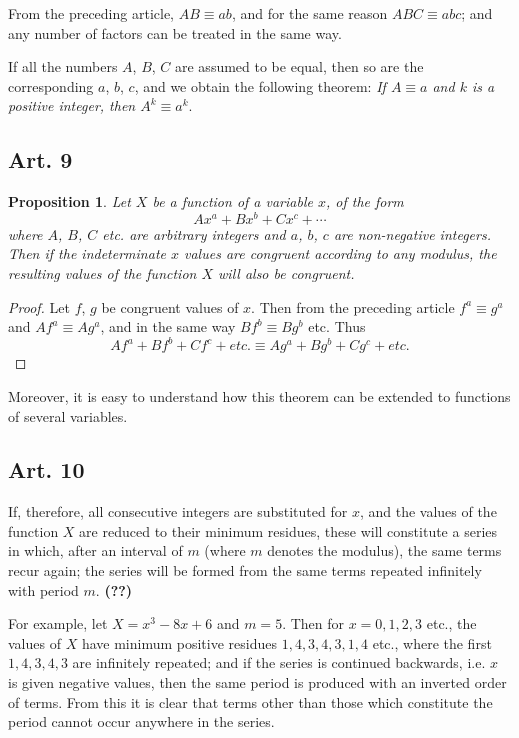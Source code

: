 \documentclass{book}
\theoremstyle{plain}
\newtheorem{proposition}{Proposition}
\begin{document}
From the preceding article, $AB \equiv ab$, and for the same reason $ABC \equiv abc$; and any number of factors can be treated in the same way.

If all the numbers $A$, $B$, $C$ are assumed to be equal, then so are the corresponding $a$, $b$, $c$, and we obtain the following theorem: \textit{If $A \equiv a$ and $k$ is a positive integer, then $A^k \equiv a^k$}.

\subsection*{Art. 9} 
\begin{proposition} Let $X$ be a function of a variable $x$, of the form
\[ A x^a + B x^b + C x^c + \cdots \]
where $A$, $B$, $C$ etc. are arbitrary integers and $a$, $b$, $c$ are non-negative integers.  Then if the indeterminate $x$ values are congruent according to any modulus, the resulting values of the function $X$ will also be congruent. \end{proposition}
\begin{proof} Let $f$, $g$ be congruent values of $x$.  Then from the preceding article $f^a \equiv g^a$ and $Af^a \equiv Ag^a$, and in the same way $Bf^b \equiv Bg^b$ etc.  Thus 
\[ Af^a + Bf^b + Cf^c + \textit{etc}. \equiv Ag^a + Bg^b + Cg^c + \textit{etc}. \]
\end{proof}
Moreover, it is easy to understand how this theorem can be extended to functions of several variables.

\subsection*{Art. 10}

If, therefore, all consecutive integers are substituted for $x$, and the values of the function $X$ are reduced to their minimum residues, these will constitute a series in which, after an interval of $m$ (where $m$ denotes the modulus), the same terms recur again; the series will be formed from the same terms repeated infinitely with period $m$. \textbf{(??)}

For example, let  $X = x^3 - 8x + 6$ and $m=5$.   Then for $x = 0,1,2,3$ etc., the values of $X$ have minimum positive residues $1,4,3,4,3,1, 4$ etc., where the first $1,4,3,4,3$ are infinitely repeated; and if the series is continued backwards, i.e. $x$ is given negative values, then the same period is produced with an inverted order of terms.  From this it is clear that terms other than those which constitute the period cannot occur anywhere in the series.
\end{document}
